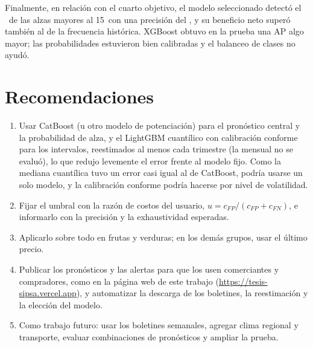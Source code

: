 Finalmente, en relación con el cuarto objetivo, el modelo seleccionado detectó el \crece\pct\ de las alzas mayores al 15\pct\ con una precisión del \cprece\pct, y su beneficio neto superó también al de la frecuencia histórica. XGBoost obtuvo en la prueba una AP algo mayor; las probabilidades estuvieron bien calibradas y el balanceo de clases no ayudó.

\section{Recomendaciones}

\begin{enumerate}[nosep]
\item Usar CatBoost (u otro modelo de potenciación) para el pronóstico central y la probabilidad de alza, y el LightGBM cuantílico con calibración conforme para los intervalos, reestimados al menos cada trimestre (la mensual no se evaluó), lo que redujo levemente el error frente al modelo fijo. Como la mediana cuantílica tuvo un error casi igual al de CatBoost, podría usarse un solo modelo, y la calibración conforme podría hacerse por nivel de volatilidad.
\item Fijar el umbral con la razón de costos del usuario, $u=c_{FP}/(c_{FP}+c_{FN})$, e informarlo con la precisión y la exhaustividad esperadas.
\item Aplicarlo sobre todo en frutas y verduras; en los demás grupos, usar el último precio.
\item Publicar los pronósticos y las alertas para que los usen comerciantes y compradores, como en la página web de este trabajo (\url{https://tesis-sipsa.vercel.app}), y automatizar la descarga de los boletines, la reestimación y la elección del modelo.
\item Como trabajo futuro: usar los boletines semanales, agregar clima regional y transporte, evaluar combinaciones de pronósticos y ampliar la prueba.
\end{enumerate}

\FloatBarrier
